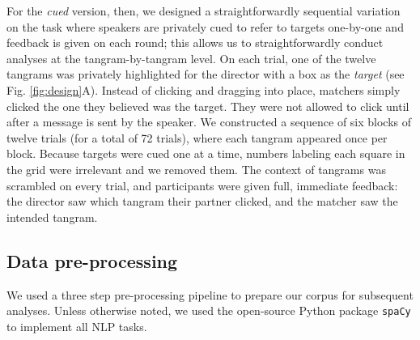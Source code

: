 For the \emph{cued} version, then, we designed a straightforwardly sequential variation on the task where speakers are privately cued to refer to targets one-by-one and feedback is given on each round; this allows us to straightforwardly conduct analyses at the tangram-by-tangram level. On each trial, one of the twelve tangrams was privately highlighted for the director with a box as the \emph{target} (see Fig. \ref{fig:design}A). Instead of clicking and dragging into place, matchers simply clicked the one they believed was the target. They were not allowed to click until after a message is sent by the speaker.  We constructed a sequence of six blocks of twelve trials (for a total of 72 trials), where each tangram appeared once per block.%
Because targets were cued one at a time, numbers labeling each square in the grid were irrelevant and we removed them. The context of tangrams was scrambled on every trial, and participants were given full, immediate feedback: the director saw which tangram their partner clicked, and the matcher saw the intended tangram.

\subsection{Data pre-processing}

We used a three step pre-processing pipeline to prepare our corpus for subsequent analyses. Unless otherwise noted, we used the open-source Python package \texttt{spaCy} to implement all NLP tasks. 

